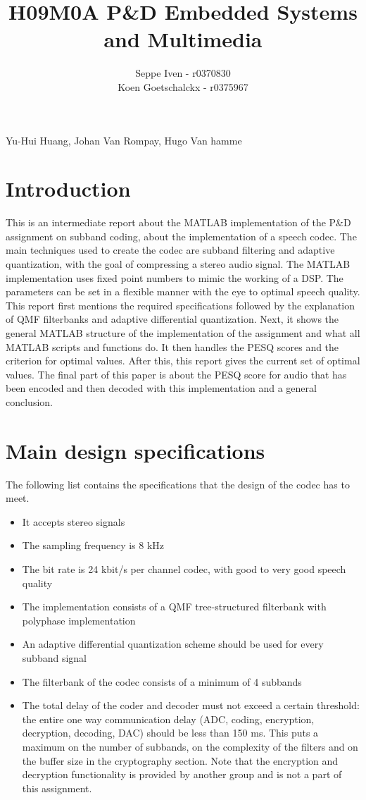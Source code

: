 \documentclass[a4paper]{article}
\title{H09M0A P\&D Embedded Systems and Multimedia}
\author{Seppe Iven - r0370830 \\ Koen Goetschalckx - r0375967}
\begin{document}
 
\maketitle
\begin{center} Yu-Hui Huang, Johan Van Rompay, Hugo Van hamme
\end{center}

\section{Introduction}
This is an intermediate report about the MATLAB implementation of the P\&D assignment on subband coding, about the implementation of a speech codec. The main techniques used to create the codec are subband filtering and adaptive quantization, with the goal of compressing a stereo audio signal. The MATLAB implementation uses fixed point numbers to mimic the working of a DSP. The parameters can be set in a flexible manner with the eye to optimal speech quality.\\

This report first mentions the required specifications followed by the explanation of QMF filterbanks and adaptive differential quantization. Next, it shows the general MATLAB structure of the implementation of the assignment and what all MATLAB scripts and functions do. It then handles the PESQ scores and the criterion for optimal values. After this, this report gives the current set of optimal values. The final part of this paper is about the PESQ score for audio that has been encoded and then decoded with this implementation and a general conclusion.

\section{Main design specifications}
The following list contains the specifications that the design of the codec has to meet.

\begin{itemize}
\item It accepts stereo signals
\item The sampling frequency is 8 kHz
\item The bit rate is 24 kbit/s per channel codec, with good to very good speech quality
\item The implementation consists of a QMF tree-structured filterbank with polyphase implementation
\item An adaptive differential quantization scheme should be used for every subband signal
\item The filterbank of the codec consists of a minimum of 4 subbands
\item The total delay of the coder and decoder must not exceed a certain threshold: the entire one way communication delay (ADC, coding, encryption, decryption, decoding, DAC) should be less than 150 ms. This puts a maximum on the number of subbands, on the complexity of the filters and on the buffer size in the cryptography section. Note that the encryption and decryption functionality is provided by another group and is not a part of this assignment.

\end{itemize}
\end{document}
